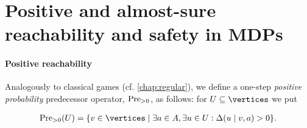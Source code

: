 %

\section{Positive and almost-sure reachability and safety in MDPs}



\paragraph{Positive reachability}  
Analogously to classical games (cf. \cref{chap:regular}), we define a one-step \emph{positive 
probability} predecessor 
operator, $\text{Pre}_{>0}$,
as follows: for $U\subseteq \vertices$ we put

\begin{align*}
\PrePos(U) &= \{v \in \vertices \mid \exists a \in \actions, \exists u \in U: 
\probTranFunc(u\mid v,a)>0 \}.\\
\end{align*}

